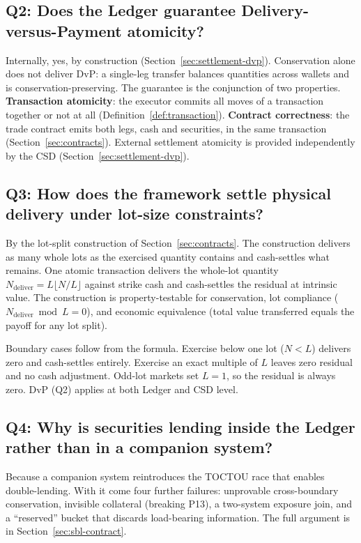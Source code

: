 \subsection*{Q2: Does the Ledger guarantee Delivery-versus-Payment atomicity?}

Internally, yes, by construction (Section~\ref{sec:settlement-dvp}). Conservation alone does not deliver DvP: a single-leg transfer balances quantities across wallets and is conservation-preserving. The guarantee is the conjunction of two properties. \textbf{Transaction atomicity}: the executor commits all moves of a transaction together or not at all (Definition~\ref{def:transaction}). \textbf{Contract correctness}: the trade contract emits both legs, cash and securities, in the same transaction (Section~\ref{sec:contracts}). External settlement atomicity is provided independently by the CSD (Section~\ref{sec:settlement-dvp}).

\subsection*{Q3: How does the framework settle physical delivery under lot-size constraints?}

By the lot-split construction of Section~\ref{sec:contracts}. The construction delivers as many whole lots as the exercised quantity contains and cash-settles what remains. One atomic transaction delivers the whole-lot quantity $N_{\text{deliver}} = L\lfloor N/L\rfloor$ against strike cash and cash-settles the residual at intrinsic value. The construction is property-testable for conservation, lot compliance ($N_{\text{deliver}} \bmod L = 0$), and economic equivalence (total value transferred equals the payoff for any lot split).

Boundary cases follow from the formula. Exercise below one lot ($N<L$) delivers zero and cash-settles entirely. Exercise an exact multiple of $L$ leaves zero residual and no cash adjustment. Odd-lot markets set $L=1$, so the residual is always zero. DvP (Q2) applies at both Ledger and CSD level.

\subsection*{Q4: Why is securities lending inside the Ledger rather than in a companion system?}

Because a companion system reintroduces the TOCTOU race that enables double-lending. With it come four further failures: unprovable cross-boundary conservation, invisible collateral (breaking P13), a two-system exposure join, and a ``reserved'' bucket that discards load-bearing information. The full argument is in Section~\ref{sec:sbl-contract}.

